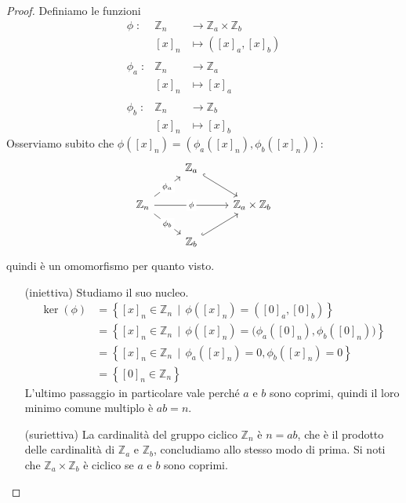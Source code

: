 \begin{proof}
	Definiamo le funzioni
	\begin{equation*}
		\begin{array}{rll}
			\phi \; \colon & \mathbb{Z}_n & \longrightarrow\mathbb{Z}_a \times \mathbb{Z}_b\\
			& [x]_n & \longmapsto\left([x]_a,[x]_b\right) \\
			 & & \\
			\phi_a \; \colon & \mathbb{Z}_n & \longrightarrow \mathbb{Z}_a \\
			& [x]_n & \longmapsto[x]_a\\
			 & & \\
			\phi_b \; \colon & \mathbb{Z}_n & \longrightarrow\mathbb{Z}_b \\
			& [x]_n & \longmapsto[x]_b
		\end{array}
	\end{equation*}
	Osserviamo subito che $\phi([x]_n)=\left(\phi_a([x]_n),\phi_b([x]_n)\right)$:
	\begin{equation*}
	\begin{tikzcd}
	& \mathbb{Z}_a \arrow[rd, hook] &                                \\
	\mathbb{Z}_n \arrow[ru, "\phi_a" description] \arrow[rd, "\phi_b" description] \arrow[rr, "\phi" description] &                               & \mathbb{Z}_a\times\mathbb{Z}_b \\
	& \mathbb{Z}_b \arrow[ru, hook] &                               
	\end{tikzcd}
	\end{equation*}
	quindi è un omomorfismo per quanto visto.
	\begin{itemize}
		\item[(iniettiva)] Studiamo il suo nucleo.
		\begin{align*}
		\ker(\phi)&=\left\{[x]_n\in\mathbb{Z}_n \, \mid \, \phi([x]_n)=\left([0]_a,[0]_b\right)\right\}\\
		&=\left\{[x]_n\in\mathbb{Z}_n \, \mid \, \phi([x]_n)=\big(\phi_a([0]_n),\phi_b([0]_n)\big)\right\}\\
		&=\left\{[x]_n\in\mathbb{Z}_n \, \mid \, \phi_a([x]_n)=0,\phi_b([x]_n)=0\right\}\\
		&=\left\{[0]_n\in\mathbb{Z}_n\right\}
		\end{align*}
		L'ultimo passaggio in particolare vale perché $a$ e $b$ sono coprimi, quindi il loro minimo comune multiplo è $ab=n$.
		\item[(suriettiva)] La cardinalità del gruppo ciclico $\mathbb{Z}_n$ è $n=ab$, che è il prodotto delle cardinalità di $\mathbb{Z}_a$ e $\mathbb{Z}_b$, concludiamo allo stesso modo di prima. Si noti che $\mathbb{Z}_a\times \mathbb{Z}_b$ è ciclico se $a$ e $b$ sono coprimi.
	\end{itemize}
\end{proof}
